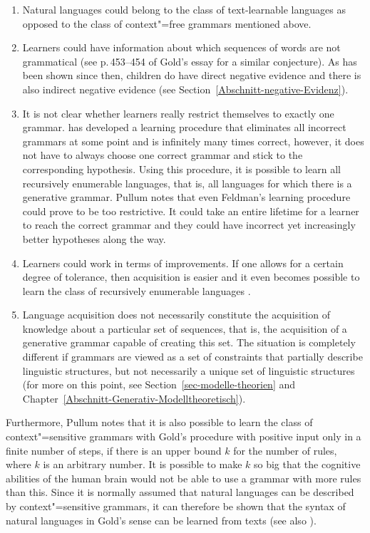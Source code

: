\begin{enumerate}
\item Natural languages could belong to the class of text-learnable languages as opposed to the class of context"=free grammars mentioned above.

\item Learners could have information about which sequences of words are not grammatical (see p.\,453--454 of Gold's essay for a similar
conjecture). As has been shown since then, children do have direct negative evidence and there is also indirect
negative evidence (see Section~\ref{Abschnitt-negative-Evidenz}). 

\item It is not clear whether learners really restrict themselves to exactly one grammar. \citet{Feldman72a} has developed a learning procedure that
eliminates all incorrect grammars at some point and is infinitely many times correct, however, it does not have to always choose one correct grammar
and stick to the corresponding hypothesis.
Using this procedure, it is possible to learn all recursively enumerable languages, that is, all languages
for which there is a generative grammar. Pullum notes that even Feldman's learning procedure could prove to be too restrictive. It could take an entire
lifetime for a learner to reach the correct grammar and they could have incorrect yet increasingly better hypotheses along the way.

\item Learners could work in terms of improvements. If one allows for a certain degree of tolerance, then acquisition is easier and it even becomes
possible to learn the class of recursively enumerable languages  \citep{Wharton74a}.

\item Language acquisition does not necessarily constitute the acquisition of knowledge about a particular set of sequences, that is, the acquisition
of a generative grammar capable of creating this set. The situation is completely different if grammars are viewed as a set of constraints that
partially describe linguistic structures, but not necessarily a unique set of linguistic structures (for more on this point, see
      Section~\ref{sec-modelle-theorien} and Chapter~\ref{Abschnitt-Generativ-Modelltheoretisch}).
\end{enumerate}

\noindent
Furthermore, Pullum notes that it is also possible to learn the class of context"=sensitive grammars
with Gold's procedure with positive input only in a finite number of steps, if there is an upper
bound $k$ for the number of rules, where $k$ is an arbitrary number.
It is possible to make $k$ so big that the cognitive abilities of the human brain would not be able to use a grammar with more rules than this.
Since it is normally assumed that natural languages can be described by context"=sensitive grammars, it can therefore
be shown that the syntax of natural languages in Gold's sense can be learned from texts (see also \citealp[--196]{SP2002b}).  

